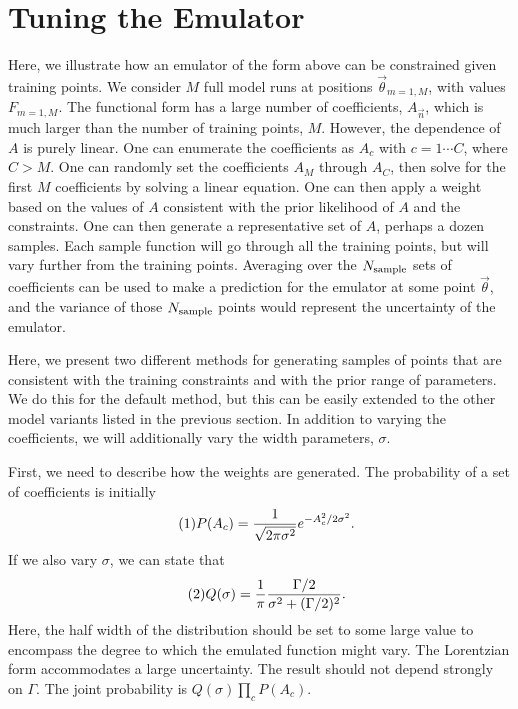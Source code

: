 \documentclass[12pt]{article}
\numberwithin{equation}{section}
\numberwithin{figure}{section}
\newcommand\eqnumber{\addtocounter{equation}{1}\tag{\theequation}}
\begin{document}
\section{Tuning the Emulator}

Here, we illustrate how an emulator of the form above can be constrained given training points. We consider $M$ full model runs at positions $\vec{\theta}_{m=1,M}$, with values $F_{m=1,M}$. The functional form has a large number of coefficients, $A_{\vec{n}}$, which is much larger than the number of training points, $M$. However, the dependence of $A$ is purely linear. One can enumerate the coefficients as $A_c$ with $c=1\cdots C$, where $C>M$. One can randomly set the coefficients $A_M$ through $A_C$, then solve for the first $M$ coefficients by solving a linear equation. One can then apply a weight based on the values of $A$ consistent with the prior likelihood of $A$ and the constraints. One can then generate a representative set of $A$, perhaps a dozen samples. Each sample function will go through all the training points, but will vary further from the training points. Averaging over the $N_{\rm sample}$ sets of coefficients can be used to make a prediction for the emulator at some point $\vec{\theta}$, and the variance of those $N_{\rm sample}$ points would represent the uncertainty of the emulator.

Here, we present two different methods for generating samples of points that are consistent with the training constraints and with the prior range of parameters. We do this for the default method, but this can be easily extended to the other model variants listed in the previous section. In addition to varying the coefficients, we will additionally vary the width parameters, $\sigma$.

First, we need to describe how the weights are generated. The probability of a set of coefficients is initially 
\begin{align*}\eqnumber
P(A_c)&=\frac{1}{\sqrt{2\pi \sigma^2}}e^{-A_c^2/2\sigma^2}.
\end{align*}
If we also vary $\sigma$, we can state that 
\begin{align*}\eqnumber
Q(\sigma)&=\frac{1}{\pi}\frac{\Gamma/2}{\sigma^2+(\Gamma/2)^2}.
\end{align*}
Here, the half width of the distribution should be set to some large value to encompass the degree to which the emulated function might vary. The Lorentzian form accommodates a large uncertainty. The result should not depend strongly on $\Gamma$. The joint probability is $Q(\sigma)\prod_c P(A_c)$. 
\end{document}
